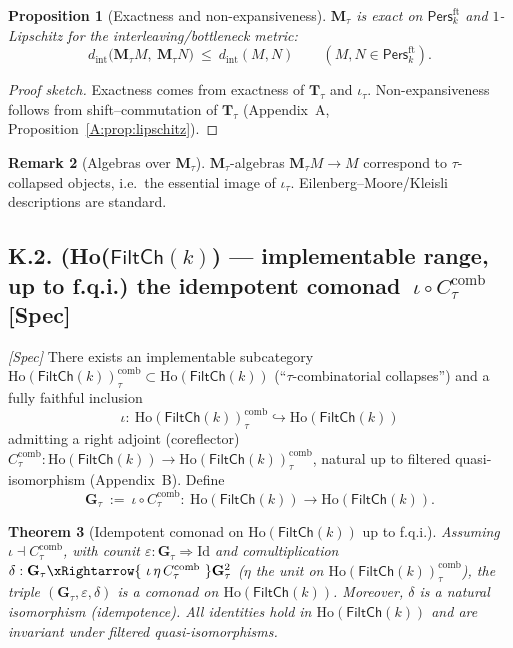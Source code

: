 \documentclass[11pt]{article}
\DeclareRobustCommand{\hyp}{\nobreakdash-}
\newcommand{\Pers}{\mathsf{Pers}}
\newcommand{\Ho}{\mathrm{Ho}}
\numberwithin{equation}{section}
\newtheorem{theorem}{Theorem}[section]
\newtheorem{proposition}[theorem]{Proposition}
\theoremstyle{definition}
\newtheorem{remark}[theorem]{Remark}
\begin{document}
\begin{proposition}[Exactness and non\hyp expansiveness]\label{K:prop:exact-lip}
\(\mathbf{M}_\tau\) is exact on \(\Pers^{\mathrm{ft}}_k\) and \(1\)\hyp Lipschitz for the interleaving/bottleneck metric:
\[
d_{\mathrm{int}}\!\big(\mathbf{M}_\tau M,\ \mathbf{M}_\tau N\big)\ \le\ d_{\mathrm{int}}(M,N)\qquad(M,N\in\Pers^{\mathrm{ft}}_k).
\]
\end{proposition}

\begin{proof}[Proof sketch]
Exactness comes from exactness of \(\mathbf{T}_\tau\) and \(\iota_\tau\). Non\hyp expansiveness follows from shift–commutation of \(\mathbf{T}_\tau\) (Appendix~A, Proposition~\ref{A:prop:lipschitz}).
\end{proof}

\begin{remark}[Algebras over \(\mathbf{M}_\tau\)]
\(\mathbf{M}_\tau\)\hyp algebras \(\mathbf{M}_\tau M \to M\) correspond to \(\tau\)\hyp collapsed objects, i.e.\ the essential image of \(\iota_\tau\).
Eilenberg--Moore/Kleisli descriptions are standard.
\end{remark}

\subsection*{K.2. (Ho(\(\mathsf{FiltCh}(k)\)) — implementable range, up to f.q.i.) the idempotent comonad \(\ \iota\circ C_\tau^{\mathrm{comb}}\) [Spec]}
\emph{[Spec]} There exists an implementable subcategory \(\Ho(\mathsf{FiltCh}(k))_\tau^{\mathrm{comb}}\subset \Ho(\mathsf{FiltCh}(k))\) (``\(\tau\)\hyp combinatorial collapses'') and a fully faithful inclusion
\[
\iota:\ \Ho(\mathsf{FiltCh}(k))_\tau^{\mathrm{comb}}\hookrightarrow \Ho(\mathsf{FiltCh}(k))
\]
admitting a right adjoint (coreflector) \(C_\tau^{\mathrm{comb}}:\Ho(\mathsf{FiltCh}(k))\to \Ho(\mathsf{FiltCh}(k))_\tau^{\mathrm{comb}}\), natural up to filtered quasi\hyp isomorphism (Appendix~B). Define
\[
\mathbf{G}_\tau\ :=\ \iota\circ C_\tau^{\mathrm{comb}}:\ \Ho(\mathsf{FiltCh}(k))\longrightarrow \Ho(\mathsf{FiltCh}(k)).
\]

\begin{theorem}[Idempotent comonad on \(\Ho(\mathsf{FiltCh}(k))\) up to f.q.i.]\label{K:thm:comonad}
Assuming \(\iota\dashv C_\tau^{\mathrm{comb}}\), with counit \(\varepsilon:\mathbf{G}_\tau\Rightarrow \mathrm{Id}\) and comultiplication
\(\delta:\mathbf{G}_\tau\xRightarrow{\ \iota\,\eta\,C_\tau^{\mathrm{comb}}\ }\mathbf{G}_\tau^2\)
(\(\eta\) the unit on \(\Ho(\mathsf{FiltCh}(k))_\tau^{\mathrm{comb}}\)), the triple \((\mathbf{G}_\tau,\varepsilon,\delta)\) is a comonad on \(\Ho(\mathsf{FiltCh}(k))\).
Moreover, \(\delta\) is a natural isomorphism (idempotence).
All identities hold in \(\Ho(\mathsf{FiltCh}(k))\) and are invariant under filtered quasi\hyp isomorphisms.
\end{theorem}
\end{document}
